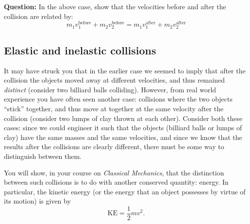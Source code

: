 \begin{question}
\textbf{Question:} In the above case, show that the velocities before and after the collision are related by:
\begin{equation}
m_1 v_1^\text{before} + m_2 v_2^\text{before} = m_1 v_1^\text{after} + m_2 v_2^\text{after}
\end{equation}
\end{question}

\subsection*{Elastic and inelastic collisions}

It may have struck you that in the earlier case we seemed to imply that after the collision the objects moved away at different velocities, and thus remained \textsl{distinct} (consider two billiard balls colliding). However, from real world experience you have often seen another case: collisions where the two objects ``stick'' together, and thus move at together at the same velocity after the collision (consider two lumps of clay thrown at each other). Consider both these cases: since we could engineer it such that the objects (billiard balls or lumps of clay) have the same masses and the same velocities, and since we know that the results after the collisions are clearly different, there must be some way to distinguish between them.

You will show, in your course on \textsl{Classical Mechanics}, that the distinction between such collisions is to do with another conserved quantity: energy. In particular, the kinetic energy (or the energy that an object possesses by virtue of its motion) is given by \begin{equation}
\text{KE} = \frac{1}{2} m v^2.
\end{equation}

